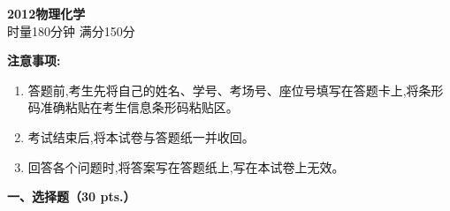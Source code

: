 \begin{center}
    {\LARGE \textbf{2012物理化学}} \\[2ex]
    {\large 时量180分钟 \quad 满分150分}
\end{center}

\vspace{0.5cm}
\noindent\textbf{注意事项:}
\begin{enumerate}[label=\arabic*., parsep=0pt, itemsep=0pt]
    \item 答题前,考生先将自己的姓名、学号、考场号、座位号填写在答题卡上,将条形码准确粘贴在考生信息条形码粘贴区。
    \item 考试结束后,将本试卷与答题纸一并收回。
    \item 回答各个问题时,将答案写在答题纸上,写在本试卷上无效。
\end{enumerate}

\vspace{0.5cm}
\noindent\textbf{一、选择题（30 pts.）}

